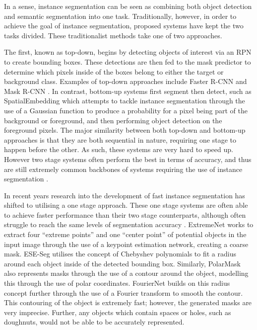 In a sense, instance segmentation can be seen as combining both object detection and semantic segmentation into one task. Traditionally, however, in order to achieve the goal of instance segmentation, proposed systems have kept the two tasks divided. These traditionalist methods take one of two approaches. 

The first, known as top-down, begins by detecting objects of interest via an RPN to create bounding boxes. These detections are then fed to the mask predictor to determine which pixels inside of the boxes belong to either the target or background class. Examples of top-down approaches include Faster R-CNN \cite{ren_faster_2015} and Mask R-CNN \cite{he_mask_2017}. In contrast, bottom-up systems first segment then detect, such as SpatialEmbedding \cite{neven_instance_2019} which attempts to tackle instance segmentation through the use of a Gaussian function to produce a probability for a pixel being part of the background or foreground, and then performing object detection on the foreground pixels. The major similarity between both top-down and bottom-up approaches is that they are both sequential in nature, requiring one stage to happen before the other. As such, these systems are very hard to speed up. However two stage systems often perform the best in terms of accuracy, and thus are still extremely common backbones of systems requiring the use of instance segmentation \cite{soviany_optimizing_2018}.

In recent years research into the development of fast instance segmentation has shifted to utilising a one stage approach. These one stage systems are often able to achieve faster performance than their two stage counterparts, although often struggle to reach the same levels of segmentation accuracy \cite{soviany_optimizing_2018}. ExtremeNet \cite{zhou_bottom-up_2019} works to extract four ``extreme points'' and one ``center point'' of potential objects in the input image through the use of a keypoint estimation network, creating a coarse mask. ESE-Seg \cite{xu_explicit_2019} utilises the concept of Chebyshev polynomials to fit a radius around each object inside of the detected bounding box. Similarly, PolarMask \cite{xie_polarmask_2020} also represents masks through the use of a contour around the object, modelling this through the use of polar coordinates. FourierNet \cite{riaz_fouriernet_2020} builds on this radius concept further through the use of a Fourier transform to smooth the contour. This contouring of the object is extremely fast; however, the generated masks are very imprecise. Further, any objects which contain spaces or holes, such as doughnuts, would not be able to be accurately represented. 

